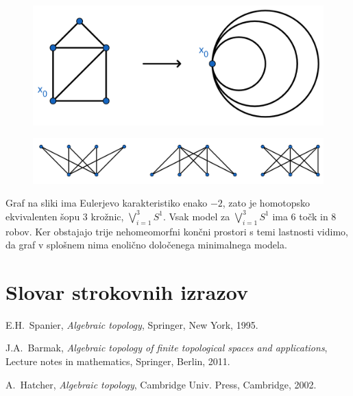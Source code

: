 \documentclass[mat1]{fmfdelo}
\DeclareRobustCommand{\h}{
    \mathcal{H}}
\DeclareRobustCommand{\pot}{
    $\h-$pot
}
\begin{document}
\begin{primer}
    \begin{figure}[h]
        \centering
        \includegraphics[width=0.55\linewidth]{v3.png}
    \end{figure}
    \begin{figure}[h]
        \centering
        \includegraphics[width=0.8\linewidth]{grafi.png}
    \end{figure}

    Graf na sliki ima Eulerjevo karakteristiko enako $-2$, zato je homotopsko ekvivalenten šopu $3$ krožnic, $\bigvee\limits_{i=1}^{3}S^1$. Vsak model za $\bigvee\limits_{i=1}^{3}S^1$ ima $6$ točk in $8$ robov. Ker obstajajo trije nehomeomorfni končni prostori s temi lastnosti vidimo, da graf v splošnem nima enolično določenega minimalnega modela.
\end{primer}

\section*{Slovar strokovnih izrazov}


\geslo{$\h-$path}{\pot}


\begin{thebibliography}{99}

E.H.~Spanier, \emph{Algebraic topology}, Springer, New York, 1995.

J.A.~Barmak, \emph{Algebraic topology of finite topological spaces and applications}, Lecture notes in mathematics, Springer, Berlin, 2011.

A.~Hatcher, \emph{Algebraic topology}, Cambridge Univ. Press, Cambridge, 2002.



\end{thebibliography}
\end{document}
